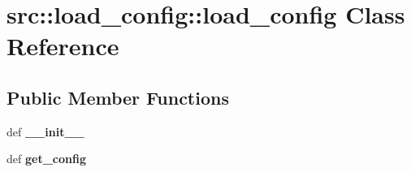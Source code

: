 \hypertarget{classsrc_1_1load__config_1_1load__config}{
\section{src::load\_\-config::load\_\-config Class Reference}
\label{classsrc_1_1load__config_1_1load__config}
}
\subsection*{Public Member Functions}
\begin{DoxyCompactItemize}
\item 
\hypertarget{classsrc_1_1load__config_1_1load__config_a37d3a3770d85c95b4ff8626f8e1f255d}{
def {\bfseries \_\-\_\-init\_\-\_\-}}
\label{classsrc_1_1load__config_1_1load__config_a37d3a3770d85c95b4ff8626f8e1f255d}

\item 
\hypertarget{classsrc_1_1load__config_1_1load__config_ad54d6a846ea9c45f889dc7c45d9c83db}{
def {\bfseries get\_\-config}}
\label{classsrc_1_1load__config_1_1load__config_ad54d6a846ea9c45f889dc7c45d9c83db}

\end{DoxyCompactItemize}
